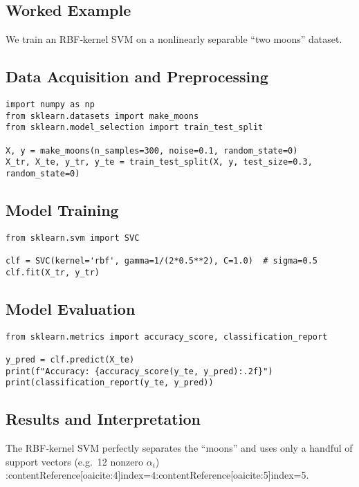 \documentclass[11pt]{article}
\begin{document}
\subsection{Worked Example}
We train an RBF‐kernel SVM on a nonlinearly separable “two moons” dataset.

\subsection{Data Acquisition and Preprocessing}
\begin{lstlisting}
import numpy as np
from sklearn.datasets import make_moons
from sklearn.model_selection import train_test_split

X, y = make_moons(n_samples=300, noise=0.1, random_state=0)
X_tr, X_te, y_tr, y_te = train_test_split(X, y, test_size=0.3, random_state=0)
\end{lstlisting}

\subsection{Model Training}
\begin{lstlisting}
from sklearn.svm import SVC

clf = SVC(kernel='rbf', gamma=1/(2*0.5**2), C=1.0)  # sigma=0.5
clf.fit(X_tr, y_tr)
\end{lstlisting}

\subsection{Model Evaluation}
\begin{lstlisting}
from sklearn.metrics import accuracy_score, classification_report

y_pred = clf.predict(X_te)
print(f"Accuracy: {accuracy_score(y_te, y_pred):.2f}")
print(classification_report(y_te, y_pred))
\end{lstlisting}

\subsection{Results and Interpretation}
The RBF‐kernel SVM perfectly separates the “moons” and uses only a handful of support vectors (e.g.\ 12 nonzero $\alpha_i$) :contentReference[oaicite:4]{index=4}:contentReference[oaicite:5]{index=5}.
\end{document}
